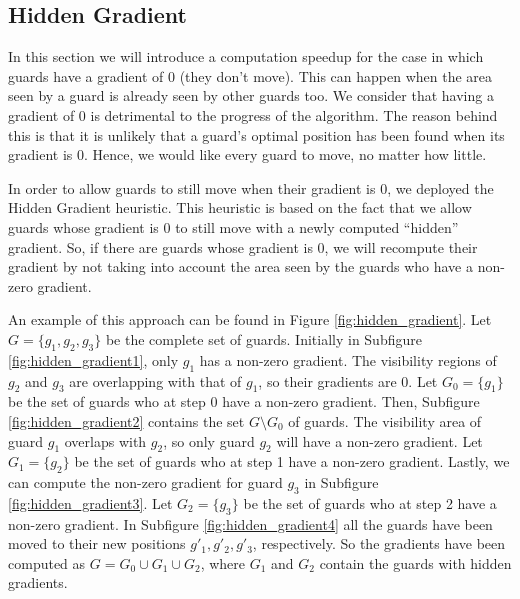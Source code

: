 \subsection{Hidden Gradient}
In this section we will introduce a computation speedup for the case in which guards have a gradient of 0 (they don't move). This can happen when the area seen by a guard is already seen by other guards too. We consider that having a gradient of 0 is detrimental to the progress of the algorithm. The reason behind this is that it is unlikely that a guard's optimal position has been found when its gradient is 0. Hence, we would like every guard to move, no matter how little.

In order to allow guards to still move when their gradient is 0, we deployed the Hidden Gradient heuristic. This heuristic is based on the fact that we allow guards whose gradient is 0 to still move with a newly computed ``hidden'' gradient. So, if there are guards whose gradient is 0, we will recompute their gradient by not taking into account the area seen by the guards who have a non-zero gradient.

An example of this approach can be found in Figure \ref{fig:hidden_gradient}. Let $G = \{g_1, g_2, g_3\}$ be the complete set of guards. Initially in Subfigure \ref{fig:hidden_gradient1}, only $g_1$ has a non-zero gradient. The visibility regions of $g_2$ and $g_3$ are overlapping with that of $g_1$, so their gradients are 0. Let $G_0 = \{g_1\}$ be the set of guards who at step 0 have a non-zero gradient. 
Then, Subfigure \ref{fig:hidden_gradient2} contains the set $G \setminus G_0$ of guards. The visibility area of guard $g_1$ overlaps with $g_2$, so only guard $g_2$ will have a non-zero gradient. Let $G_1 = \{g_2\}$ be the set of guards who at step 1 have a non-zero gradient.
Lastly, we can compute the non-zero gradient for guard $g_3$ in Subfigure \ref{fig:hidden_gradient3}. Let $G_2 = \{g_3\}$ be the set of guards who at step 2 have a non-zero gradient.
In Subfigure \ref{fig:hidden_gradient4} all the guards have been moved to their new positions $g'_1, g'_2, g'_3$, respectively. So the gradients have been computed as $G = G_0 \cup G_1 \cup G_2$, where $G_1$ and $G_2$ contain the guards with hidden gradients.

